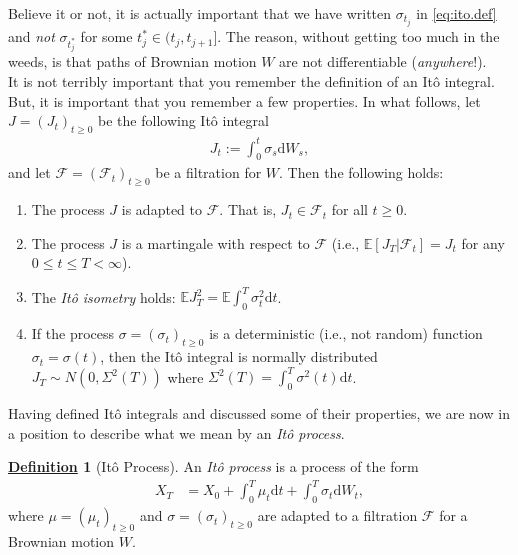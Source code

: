 \documentclass[12pt]{book}
\numberwithin{equation}{chapter}
\theoremstyle{plain}
\numberwithin{theorem}{section}
\theoremstyle{definition}
\newtheorem{definition}[theorem]{\underline{Definition}}
\numberwithin{exercise}{chapter}
\newcommand{\<}{\langle}
\renewcommand{\>}{\rangle}
\renewcommand{\(}{\left(}
\renewcommand{\)}{\right)}
\renewcommand{\[}{\left[}
\renewcommand{\]}{\right]}
\newcommand\Eb{\mathds{E}}
\newcommand\Fc{\mathscr{F}}
\newcommand\sig{\sigma}
\newcommand\dd{\mathrm{d}}
\theoremstyle{definition}
\numberwithin{question}{section}
\begin{document}
\noindent
Believe it or not, it is actually important that we have written $\sig_{t_j}$ in \eqref{eq:ito.def} and \textit{not} $\sig_{t_j^*}$ for some $t_j^* \in (t_j,t_{j+1}]$.
The reason, without getting too much in the weeds, is that paths of Brownian motion $W$ are not differentiable (\textit{anywhere}!).
\\[0.5em]
It is not terribly important that you remember the definition of an It\^o integral.  But, it is important that you remember a few properties.  In what follows, let $J = (J_t)_{t \geq 0}$ be the following It\^o integral
\begin{align}
J_t := \int_0^t \sig_s \dd W_s ,  
\end{align}
and let $\Fc = (\Fc_t)_{t \geq 0}$ be a filtration for $W$.  Then the following holds:
\begin{enumerate}
\item The process $J$ is adapted to $\Fc$.  That is, $J_t \in \Fc_t$ for all $t \geq 0$.
\item The process $J$ is a martingale with respect to $\Fc$ (i.e., $\Eb[ J_T | \Fc_t ] = J_t$ for any $0 \leq t \leq T < \infty$).
\item The \textit{It\^o isometry} holds: $\Eb J_T^2 = \Eb \int_0^T \sig_t^2 \dd t$.
\item If the process $\sig = (\sig_t)_{t \geq 0}$ is a deterministic (i.e., not random) function $\sig_t = \sig(t)$, then the It\^o integral is normally distributed
$ J_T \sim N( 0 , \Sigma^2(T) )$ where $\Sigma^2(T) = \int_0^T \sig^2(t) \dd t$.
\end{enumerate}

\noindent
Having defined It\^o integrals and discussed some of their properties, we are now in a position to describe what we mean by an \textit{It\^o process}.  

\begin{definition}[It\^o Process]
An \textit{It\^o process} is a process of the form
\begin{align}
X_T
	&=	X_0 + \int_0^T \mu_t \dd t + \int_0^T \sig_t \dd W_t , \label{eq:ito-integral}
\end{align}
where $\mu = (\mu_t)_{t \geq 0}$ and $\sig = (\sig_t)_{t \geq 0}$ are adapted to a filtration $\Fc$ for a Brownian motion $W$.
\end{definition}
\end{document}
